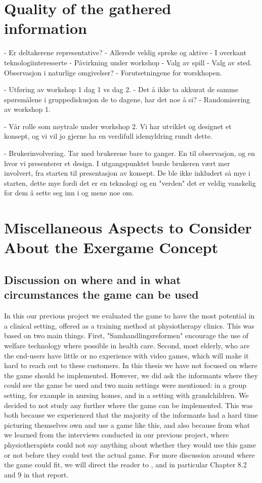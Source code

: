 \section{Quality of the gathered information}
- Er deltakerene representative?
	- Allerede veldig spreke og aktive
	- I overkant teknologiinteresserte
- Påvirkning under workshop
- Valg av spill
- Valg av sted. Observasjon i naturlige omgivelser?
- Forutsetningene for worskhopen. 

- Utføring av workshop 1 dag 1 vs dag 2.
- Det å ikke ta akkurat de samme spørsmålene i gruppediskusjon de to dagene, har det noe å si?
- Randomisering av workshop 1. 

- Vår rolle som nøytrale under workshop 2. Vi har utviklet og designet et konsept, og vi vil jo gjerne ha en verdifull idemyldring rundt dette.  

- Brukerinvolvering. Tar med brukerene bare to ganger. En til observasjon, og en hvor vi presenterer et design. I utgangspunktet burde brukeren vært mer involvert, fra starten til presentasjon av konsept. De ble ikke inkludert så mye i starten, dette mye fordi det er en teknologi og en "verden" det er veldig vanskelig for dem å sette seg inn i og mene noe om. 


\section{Miscellaneous Aspects to Consider About the Exergame Concept}
\label{sec:misc}

\subsection{Discussion on where and in what circumstances the game can be used}
\label{subsec:whatwhere}

In this our previous project \cite{project} we evaluated the game to have the most potential in a clinical setting, offered as a training method at physiotherapy clinics. This was based on two main things. First, "Samhandlingsreformen" encourage the use of welfare technology where possible in health care. Second, most elderly, who are the end-users have little or no experience with video games, which will make it hard to reach out to these customers. In this thesis we have not focused on where the game should be implemented. However, we did ask the informants where they could see the game be used and two main settings were mentioned: in a group setting, for example in nursing homes, and in a setting with grandchildren. We decided to not study any further where the game can be implemented. This was both because we experienced that the majority of the informants had a hard time picturing themselves own and use a game like this, and also because from what we learned from the interviews conducted in our previous project, where physiotherapists could not say anything about whether they would use this game or not before they could test the actual game. For more discussion around where the game could fit, we will direct the reader to \cite{project}, and in particular Chapter 8.2 and 9 in that report. 

